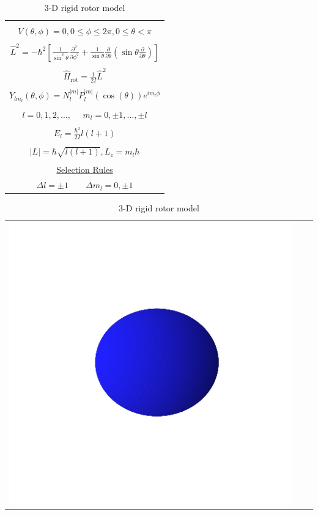 \documentclass[11pt]{article}
\begin{document}
\begin{table}[H]
   \begin{center}
   \caption{3-D rigid rotor model}
    \label{3-D Rigid rotor}
\begin{tabular}[H]{|c|}
\hline
 \\
$\displaystyle       V(\theta,\phi) = 0, 0 \leq \phi \leq 2\pi, 0 \leq \theta <
\pi$ \\
 \\
$\displaystyle     \hat L^2 = -\hbar^2 \left [
  \frac{1}{\sin^2\theta}\frac{\partial^2}{\partial \phi^2}+\frac{1}{\sin
    \theta}\frac{\partial}{\partial \theta}\left ( \sin \theta
    \frac{\partial}{\partial \theta}\right ) \right ] $ \\
\\
$\displaystyle \hat H_\text{rot} = \frac{1}{2 I} \hat L^2$ \\
\\
$\displaystyle     Y_{lm_l}(\theta,\phi)=N_l^{|m|}P_l^{|m|}(\cos(\theta))e^{im_l\phi}$ \\
\\
$\displaystyle l = 0, 1, 2, \ldots, \ \ \ \ \ \ m_l = 0,\pm 1, \ldots, \pm l$
\\
\\
$\displaystyle     E_{l}=\frac{\hbar^2}{2 I}l(l+1)$ \\
 \\
$\displaystyle |L| = \hbar \sqrt{l(l+1)}, L_z = m_l \hbar $ \\
\\ \underline{Selection Rules} \\
$\displaystyle \Delta l = \pm 1\qquad \Delta m_l = 0, \pm 1 $
\\
\end{tabular}
\begin{tabular}[H]{|ccc|}
\includegraphics[scale=0.4]{./Images/s.png} &

\end{tabular}
\end{center}
\end{table}
\end{document}
